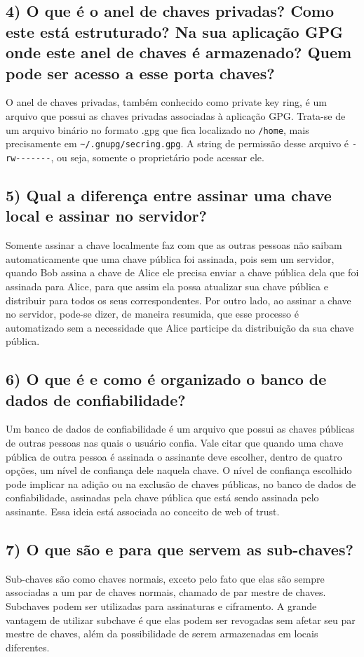 \documentclass[12pt]{article}
\begin{document}
\subsection*{4) O que é o anel de chaves privadas? Como este está estruturado? Na sua aplicação GPG onde este anel de chaves é armazenado? Quem pode ser acesso a esse porta chaves?}
O anel de chaves privadas, também conhecido como private key ring, é um arquivo que possui as chaves privadas associadas à aplicação GPG. Trata-se de um arquivo binário no formato .gpg que fica localizado no \lstinline{/home}, mais precisamente em \lstinline{~/.gnupg/secring.gpg}. A string de permissão desse arquivo é \lstinline{-rw-------}, ou seja, somente o proprietário pode acessar ele.

\subsection*{5) Qual a diferença entre assinar uma chave local e assinar no servidor?}
Somente assinar a chave localmente faz com que as outras pessoas não saibam automaticamente que uma chave pública foi assinada, pois sem um servidor, quando Bob assina a chave de Alice ele precisa enviar a chave pública dela que foi assinada para Alice, para que assim ela possa atualizar sua chave pública e distribuir para todos os seus correspondentes. Por outro lado, ao assinar a chave no servidor, pode-se dizer, de maneira resumida, que esse processo é automatizado sem a necessidade que Alice participe da distribuição da sua chave pública.

\subsection*{6) O que é e como é organizado o banco de dados de confiabilidade?}
Um banco de dados de confiabilidade é um arquivo que possui as chaves públicas de outras pessoas nas quais o usuário confia. Vale citar que quando uma chave pública de outra pessoa é assinada o assinante deve escolher, dentro de quatro opções, um nível de confiança dele naquela chave. O nível de confiança escolhido pode implicar na adição ou na exclusão de chaves públicas, no banco de dados de confiabilidade, assinadas pela chave pública que está sendo assinada pelo assinante. Essa ideia está associada ao conceito de web of trust.

\subsection*{7) O que são e para que servem as sub-chaves?}
Sub-chaves são como chaves normais, exceto pelo fato que elas são sempre associadas a um par de chaves normais, chamado de par mestre de chaves. Subchaves podem ser utilizadas para assinaturas e ciframento. A grande vantagem de utilizar subchave é que elas podem ser revogadas sem afetar seu par mestre de chaves, além da possibilidade de serem armazenadas em locais diferentes.
\end{document}

